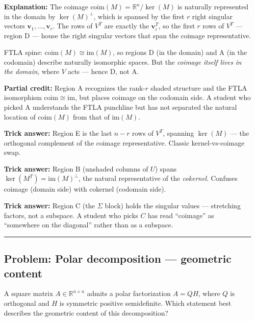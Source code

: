 \documentclass[12pt]{amsart}
\newcommand{\divider}{
  \vspace{-1em}
  \noindent
  \raisebox{-0.15ex}{\textbullet}%
  \hspace{0.5em}%
  \rule[0.5ex]{0.95\textwidth}{1.0pt}%
  \hspace{0.5em}%
  \raisebox{-0.15ex}{\textbullet}%
  \vspace{0em}
}
\begin{document}
\textbf{Explanation:}
The coimage $\mathrm{coim}(M) = \mathbb{R}^n / \ker(M)$ is naturally
represented in the domain by $\ker(M)^\perp$, which is spanned by the
first $r$ right singular vectors $\mathbf{v}_1, \ldots, \mathbf{v}_r$.
The rows of $V^T$ are exactly the $\mathbf{v}_i^T$, so the first $r$ rows
of $V^T$ --- region D --- house the right singular vectors that span the
coimage representative.

FTLA spine: $\mathrm{coim}(M) \cong \mathrm{im}(M)$, so regions D (in the
domain) and A (in the codomain) describe naturally isomorphic spaces. But
the \emph{coimage itself lives in the domain}, where $V$ acts --- hence D,
not A.

\textbf{Partial credit:}
Region A recognizes the rank-$r$ shaded structure and the FTLA isomorphism
$\mathrm{coim} \cong \mathrm{im}$, but places coimage on the codomain side.
A student who picked A understands the FTLA punchline but has not separated
the natural location of $\mathrm{coim}(M)$ from that of $\mathrm{im}(M)$.

\textbf{Trick answer:}
Region E is the last $n - r$ rows of $V^T$, spanning $\ker(M)$ --- the
orthogonal complement of the coimage representative. Classic
kernel-vs-coimage swap.

\textbf{Trick answer:}
Region B (unshaded columns of $U$) spans $\ker(M^T) = \mathrm{im}(M)^\perp$,
the natural representative of the \emph{cokernel}. Confuses coimage
(domain side) with cokernel (codomain side).

\textbf{Trick answer:}
Region C (the $\Sigma$ block) holds the singular values --- stretching
factors, not a subspace. A student who picks $C$ has read ``coimage'' as
``somewhere on the diagonal'' rather than as a subspace.

\divider

\subsection*{Problem: Polar decomposition --- geometric content}

A square matrix $A \in \mathbb{R}^{n \times n}$ admits a polar factorization
$A = QH$, where $Q$ is orthogonal and $H$ is symmetric positive semidefinite.
Which statement best describes the geometric content of this decomposition?
\end{document}
